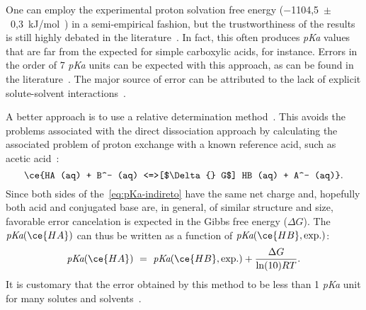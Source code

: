 One can employ the experimental proton solvation free energy
($-$1104,5~$\pm$~0,3~kJ/mol~\cite{Tissandier_1998,Marenich_2009}) in a
semi-empirical fashion, but the trustworthiness of the results is still highly
debated in the literature~\cite{Yang_2013}.
In fact, this often produces \emph{pKa} values that are far from the expected
for simple carboxylic acids, for instance.
Errors in the order of 7 \emph{pKa} units can be expected with this approach,
as can be found in the literature~\cite{Pliego_2002,Ding_2009}.
The major source of error can be attributed to the lack of explicit
solute-solvent interactions~\cite{Pliego_2002}.

A better approach is to use a relative determination method~\cite{Ding_2009}.
This avoids the problems associated with the direct dissociation approach
by calculating the associated problem of proton exchange with a known reference
acid, such as acetic acid~\cite{Goldberg_2002}:
%
\begin{equation}
  \ce{HA (aq) + B^- (aq) <=>[$\Delta{} G$] HB (aq) + A^- (aq)}\text{.}
  \label{eq:pKa-indireto}
\end{equation}
%
Since both sides of the~\cref{eq:pKa-indireto}
have the same net charge and, hopefully both acid and conjugated base are, in
general, of similar structure and size, favorable error cancelation is expected
in the Gibbs free energy ($\Delta G$).
The $\emph{pKa}(\ce{HA})$
can thus be written as a function of $\emph{pKa}(\ce{HB}, \text{exp.})$:
%
\begin{equation}
  \emph{pKa}(\ce{HA})~=~\emph{pKa}(\ce{HB}, \text{exp.}) + \frac{\Delta G}{\ln(10) R T}\text{.}
\end{equation}
%
It is customary that the error obtained by this method to be less than 1 \emph{pKa}
unit for many solutes and solvents~\cite{Ding_2009}.
